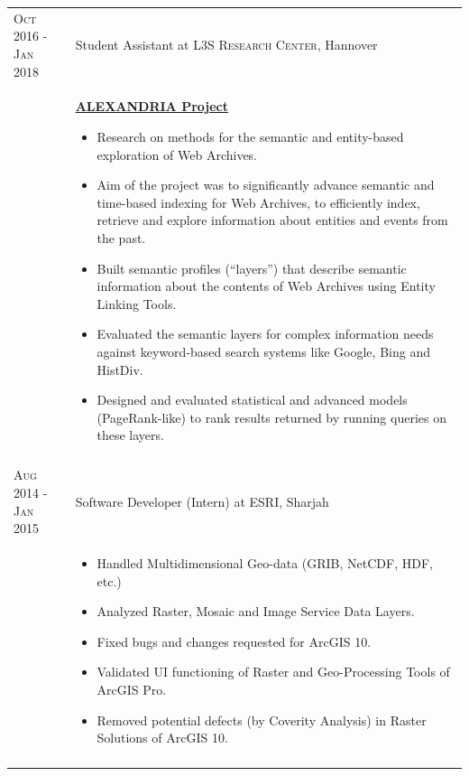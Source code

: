 \documentclass[a4paper,10pt]{article} %
\begin{document}
\begin{longtable}{l p{11cm}}

\textsc{Oct 2016 - Jan 2018} & Student Assistant at \textsc{L3S Research Center}, Hannover\\[1mm]
& \textbf{\footnotesize{\href{http://alexandria-project.eu/}{ALEXANDRIA Project}}}\vspace{0.2em}
  {\footnotesize
  	\begin{itemize}
  		\setlength\itemsep{0.2em}
 		\item Research on methods for the semantic and entity-based exploration of Web Archives. 
 		\item Aim of the project was to significantly advance semantic and time-based indexing for Web Archives, to efficiently index, retrieve and explore information about entities and events from the past.
		\item Built semantic profiles (“layers”) that describe semantic information about the
		contents of Web Archives using Entity Linking Tools.
		\item Evaluated the semantic layers for complex information needs against keyword-based search
systems like Google, Bing and HistDiv.
		\item Designed and evaluated statistical and advanced models (PageRank-like) to
		rank results returned by running queries on these layers.    
  \end{itemize}
  }\\
 \multicolumn{2}{c}{} \\[-1.5em]


\textsc{Aug 2014 - Jan 2015} & Software Developer (Intern) at \textsc{ESRI}, Sharjah\\[-1em]
& {\footnotesize
  	\begin{itemize}
  		\setlength\itemsep{0.2em}
 		\item Handled Multidimensional Geo-data (GRIB, NetCDF, HDF, etc.)
		\item Analyzed Raster, Mosaic and Image Service Data Layers.
 		\item Fixed bugs and changes requested for ArcGIS 10.
		\item Validated UI functioning of Raster and Geo-Processing Tools of ArcGIS Pro.
		\item Removed potential defects (by Coverity Analysis) in Raster Solutions of ArcGIS 10.    
  \end{itemize}
  }\\
\multicolumn{2}{c}{} \\

\end{longtable} 
\vspace{-3em}
\end{document}
